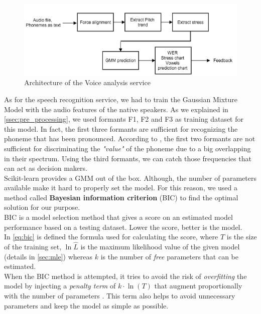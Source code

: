 \begin{figure}[!ht]
	\centering
	\includegraphics[scale=0.6]{Figures/gmm_service.png}
	\caption{Architecture of the Voice analysis service}
	\label{fig:gmm_service}
\end{figure}

\noindent As for the speech recognition service, we had to train the Gaussian Mixture Model with the audio features of the native speakers. As we explained in \ref{ssec:pre_processing}, we used formants F1, F2 and F3 as training dataset for this model. In fact, the first three formants are sufficient for recognizing the phoneme that has been pronounced. According to \cite{prica2010recognition}, the first two formants are not sufficient for discriminating the \textit{"value"} of the phoneme due to a big overlapping in their spectrum. Using the third formants, we can catch those frequencies that can act as decision makers. \\

\noindent Scikit-learn provides a GMM out of the box. Although, the number of parameters available make it hard to properly set the model. For this reason, we used a method called \textbf{Bayesian information criterion} (BIC) to find the optimal solution for our purpose. \\

\noindent BIC is a model selection method that gives a score on an estimated model performance based on a testing dataset. Lower the score, better is the model.\\
\noindent In \ref{eq:bic} is defined the formula used for calculating the score, where $T$ is the size of the training set, $\ln{\hat L}$ is the maximum likelihood value of the given model (details in \ref{sec:mle}) whereas $k$ is the number of \textit{free} parameters that can be estimated. \\
\noindent When the BIC method is attempted, it tries to avoid the risk of \textit{overfitting} the model by injecting a \textit{penalty term} of $k \cdot \ln(T)$ that augment proportionally with the number of parameters \cite{bic_info}. This term also helps to avoid unnecessary parameters and keep the model as simple as possible.

